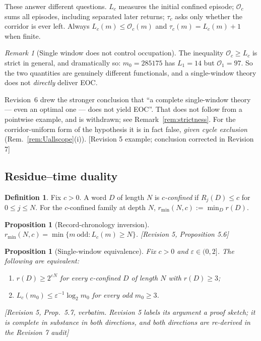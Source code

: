 \documentclass[11pt]{article}
\theoremstyle{plain}
\newtheorem{proposition}[theorem]{Proposition}
\theoremstyle{definition}
\newtheorem{definition}[theorem]{Definition}
\theoremstyle{remark}
\newtheorem{remark}[theorem]{Remark}
\newcommand{\Occ}{\mathcal{O}}
\newcommand{\rmin}{r_{\min}}
\newcommand{\status}[1]{\textsf{\footnotesize[#1]}}
\begin{document}
These answer different questions. $L_c$ measures the initial confined episode; $\Occ_c$ sums all
episodes, including separated later returns; $\tau_c$ asks only whether the corridor is ever left.
Always $L_c(m)\le\Occ_c(m)$ and $\tau_c(m)=L_c(m)+1$ when finite.

\begin{remark}[Single window does not control occupation]\label{rem:LvsO}
The inequality $\Occ_c\ge L_c$ is strict in general, and dramatically so: $m_0=285175$ has
$L_1=14$ but $\Occ_1=97$. So the two quantities are genuinely different functionals, and a
single-window theory does not \emph{directly} deliver EOC.

Revision~6 drew the stronger conclusion that ``a complete single-window theory --- even an optimal
one --- does not yield EOC''. That does not follow from a pointwise example, and is withdrawn; see
Remark~\ref{rem:strictness}. For the corridor-uniform form of the hypothesis it is in fact false,
\emph{given cycle exclusion} (Rem.~\ref{rem:Uallscope}(i)).
\status{Revision 5 example; conclusion corrected in Revision 7}
\end{remark}

\subsection{Residue--time duality}\label{sec:duality}

\begin{definition}
Fix $c>0$. A word $D$ of length $N$ is \emph{$c$-confined} if $R_j(D)\le c$ for $0\le j\le N$. For
the $c$-confined family at depth $N$, $\rmin(N,c):=\min_D r(D)$.
\end{definition}

\begin{proposition}[Record-chronology inversion]\label{prop:inversion}
$\rmin(N,c)=\min\{m\ \text{odd}: L_c(m)\ge N\}$. \status{Revision 5, Proposition 5.6}
\end{proposition}

\begin{proposition}[Single-window equivalence]\label{prop:window}
Fix $c>0$ and $\varepsilon\in(0,2]$. The following are equivalent:
\begin{enumerate}[label=(\roman*),leftmargin=2em]
\item $r(D)\ge2^{\varepsilon N}$ for every $c$-confined $D$ of length $N$ with $r(D)\ge3$;
\item $L_c(m_0)\le\varepsilon^{-1}\log_2 m_0$ for every odd $m_0\ge3$.
\end{enumerate}
\status{Revision 5, Prop.~5.7, verbatim. Revision 5 labels its argument a proof \emph{sketch}; it is
complete in substance in both directions, and both directions are re-derived in the Revision 7 audit}
\end{proposition}
\end{document}
